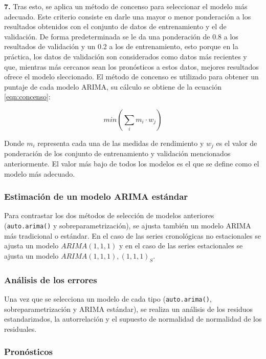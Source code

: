 \documentclass[
]{article}
\begin{document}
\textbf{7.} Tras esto, se aplica un método de concenso para seleccionar
el modelo más adecuado. Este criterio consiste en darle una mayor o
menor ponderación a los resultados obtenidos con el conjunto de datos de
entrenamiento y el de validación. De forma predeterminada se le da una
ponderación de 0.8 a los resultados de validación y un 0.2 a los de
entrenamiento, esto porque en la práctica, los datos de validación son
considerados como datos más recientes y que, mientras más cercanos sean
los pronósticos a estos datos, mejores resultados ofrece el modelo
sleccionado. El método de concenso es utilizado para obtener un puntaje
de cada modelo ARIMA, su cálculo se obtiene de la ecuación
\ref{eqn:concenso}:

\begin{equation}
\label{eqn:concenso}
min\left( \sum_i {m_i}\cdot w_j \right)
\end{equation}

Donde \(m_i\) representa cada una de las medidas de rendimiento y
\(w_j\) es el valor de ponderación de los conjunto de entrenamiento y
validación mencionados anteriormente. El valor más bajo de todos los
modelos es el que se define como el modelo más adecuado.

\subsubsection{Estimación de un modelo ARIMA estándar}

Para contrastar los dos métodos de selección de modelos anteriores
(\texttt{auto.arima()} y sobreparametrización), se ajusta también un
modelo ARIMA más tradicional o estándar. En el caso de las series
cronológicas no estacionales se ajusta un modelo \(ARIMA(1,1,1)\) y en
el caso de las series estacionales se ajusta un modelo
\(ARIMA(1,1,1),(1,1,1)_S\).

\subsubsection{Análisis de los errores}

Una vez que se selecciona un modelo de cada tipo (\texttt{auto.arima()},
sobreparametrización y ARIMA estándar), se realiza un análisis de los
residuos estandarizados, la autorrelación y el supuesto de normalidad de
normalidad de los residuales.

\subsubsection{Pronósticos}
\end{document}
